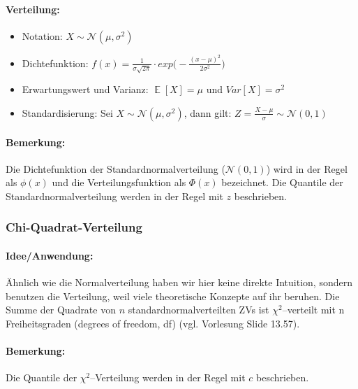 \documentclass[a4paper]{article}
\DeclareMathOperator*{\E}{\mathbb{E}}
\begin{document}
\paragraph{Verteilung:}
\begin{itemize}
\item[] Notation: $X \sim \mathcal{N}(\mu,\sigma^2)$
\item[] Dichtefunktion: $f(x)=\frac{1}{\sigma\sqrt{2\pi}} \cdot exp \Big(-\frac{(x-\mu)^2}{2 \sigma^2}\Big)$
\item[] Erwartungswert und Varianz: $\E[X]=\mu$ und $Var[X]=\sigma^2$
\item[] Standardisierung: Sei $X \sim \mathcal{N}(\mu,\sigma^2)$, dann gilt: $Z=\frac{X-\mu}{\sigma} \sim \mathcal{N}(0,1)$

\end{itemize}

\paragraph{Bemerkung:} Die Dichtefunktion der Standardnormalverteilung ($\mathcal{N}(0,1)$) wird in der Regel als $\phi(x)$ und die Verteilungsfunktion als $\Phi(x)$ bezeichnet. Die Quantile der Standardnormalverteilung werden in der Regel mit $z$ beschrieben.\\

\noindent {}

\subsubsection{Chi-Quadrat-Verteilung} \label{sec:Chi}

\paragraph{Idee/Anwendung:} Ähnlich wie die Normalverteilung haben wir hier keine direkte Intuition, sondern benutzen die Verteilung, weil viele theoretische Konzepte auf ihr beruhen. Die Summe der Quadrate von $n$ standardnormalverteilten ZVs ist $\chi^2$--verteilt mit n Freiheitsgraden (degrees of freedom, df) (vgl. Vorlesung Slide 13.57). 

\paragraph{Bemerkung:} Die Quantile der $\chi^2$--Verteilung werden in der Regel mit $c$ beschrieben.\\
\end{document}
